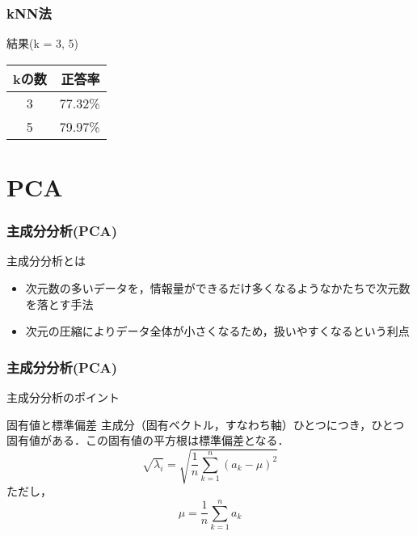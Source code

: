 \documentclass[dvipdfmx]{beamer}
\begin{document}
\begin{frame}
  \frametitle{kNN法}
  結果(k = 3, 5)
  \begin{center}
  \begin{table}
    \begin{tabular}{ c r } \toprule
      kの数 & 正答率 \\ \midrule
      3 & 77.32\% \\
      5 & 79.97\% \\ \bottomrule
    \end{tabular}
  \end{table}
  \end{center}
\end{frame}

\section{PCA}
\begin{frame}
  \frametitle{主成分分析(PCA)}
  主成分分析とは
  \begin{itemize}
    \item 次元数の多いデータを，情報量ができるだけ多くなるようなかたちで次元数を落とす手法
    \item 次元の圧縮によりデータ全体が小さくなるため，扱いやすくなるという利点
  \end{itemize}
\end{frame}

\begin{frame}
  \frametitle{主成分分析(PCA)}
   主成分分析のポイント
   \begin{block}{固有値と標準偏差}
     主成分（固有ベクトル，すなわち軸）ひとつにつき，ひとつ固有値がある．この固有値の平方根は標準偏差となる．
     \begin{equation}
       \sqrt{\lambda_{i}} = \sqrt{\frac{1}{n} \textstyle\sum_{k=1}^{n}\left(a_{k}-\mu\right)^2}
     \end{equation}
     ただし，\[ \mu = \frac{1}{n} \textstyle\sum_{k=1}^{n}a_{k} \]
    \end{block}
\end{frame}
\end{document}
